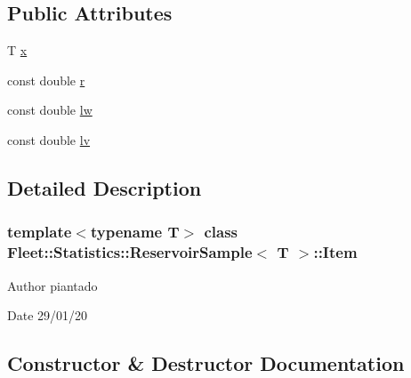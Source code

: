 \subsection*{Public Attributes}
\begin{DoxyCompactItemize}
\item 
T \hyperlink{class_fleet_1_1_statistics_1_1_reservoir_sample_1_1_item_ae845a0d698a99e1508241fd25b63dd3a}{x}
\item 
const double \hyperlink{class_fleet_1_1_statistics_1_1_reservoir_sample_1_1_item_a45c460752bf4e0b27ee406d2560479da}{r}
\item 
const double \hyperlink{class_fleet_1_1_statistics_1_1_reservoir_sample_1_1_item_af6e0c0e3569786a8896fcd7ab758a587}{lw}
\item 
const double \hyperlink{class_fleet_1_1_statistics_1_1_reservoir_sample_1_1_item_a0037b193d6712481b90416b51f2eb9d5}{lv}
\end{DoxyCompactItemize}


\subsection{Detailed Description}
\subsubsection*{template$<$typename T$>$\newline
class Fleet\+::\+Statistics\+::\+Reservoir\+Sample$<$ T $>$\+::\+Item}

\begin{DoxyAuthor}{Author}
piantado 
\end{DoxyAuthor}
\begin{DoxyDate}{Date}
29/01/20 
\end{DoxyDate}


\subsection{Constructor \& Destructor Documentation}
\mbox{\label{class_fleet_1_1_statistics_1_1_reservoir_sample_1_1_item_acad6abfadffe65005f14a4c9616aabde}} 
